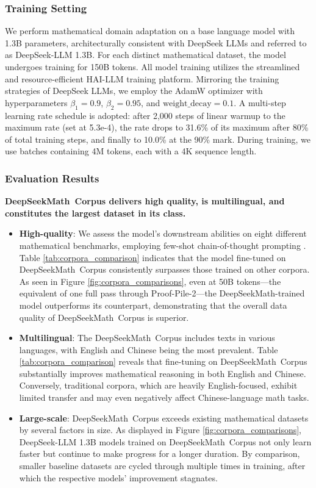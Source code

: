 \subsubsection{Training Setting}
\label{sec:quality-policy}
We perform mathematical domain adaptation on a base language model with 1.3B parameters, architecturally consistent with DeepSeek LLMs \citep{deepseek-llm} and referred to as DeepSeek-LLM 1.3B. For each distinct mathematical dataset, the model undergoes training for 150B tokens. All model training utilizes the streamlined and resource-efficient HAI-LLM \citep{haillm} training platform. Mirroring the training strategies of DeepSeek LLMs, we employ the AdamW optimizer \citep{adamW} with hyperparameters $\beta_1=0.9$, $\beta_2=0.95$, and $\mathrm{weight\_decay}=0.1$. A multi-step learning rate schedule is adopted: after 2,000 steps of linear warmup to the maximum rate (set at 5.3e-4), the rate drops to 31.6\% of its maximum after 80\% of total training steps, and finally to 10.0\% at the 90\% mark. During training, we use batches containing 4M tokens, each with a 4K sequence length.

\subsubsection{Evaluation Results}

\textbf{DeepSeekMath~Corpus delivers high quality, is multilingual, and constitutes the largest dataset in its class.}

\begin{itemize}[topsep=0pt]
    \item \textbf{High-quality}:
    We assess the model’s downstream abilities on eight different mathematical benchmarks, employing few-shot chain-of-thought prompting \cite{cot}. Table \ref{tab:corpora_comparison} indicates that the model fine-tuned on DeepSeekMath~Corpus consistently surpasses those trained on other corpora. As seen in Figure \ref{fig:corpora_comparisons}, even at 50B tokens—the equivalent of one full pass through Proof-Pile-2—the DeepSeekMath-trained model outperforms its counterpart, demonstrating that the overall data quality of DeepSeekMath~Corpus is superior.
    \item \textbf{Multilingual}:
    The DeepSeekMath~Corpus includes texts in various languages, with English and Chinese being the most prevalent. Table \ref{tab:corpora_comparison} reveals that fine-tuning on DeepSeekMath~Corpus substantially improves mathematical reasoning in both English and Chinese. Conversely, traditional corpora, which are heavily English-focused, exhibit limited transfer and may even negatively affect Chinese-language math tasks.
    \item \textbf{Large-scale}:
    DeepSeekMath~Corpus exceeds existing mathematical datasets by several factors in size. As displayed in Figure \ref{fig:corpora_comparisons}, DeepSeek-LLM 1.3B models trained on DeepSeekMath~Corpus not only learn faster but continue to make progress for a longer duration. By comparison, smaller baseline datasets are cycled through multiple times in training, after which the respective models' improvement stagnates.
\end{itemize}

